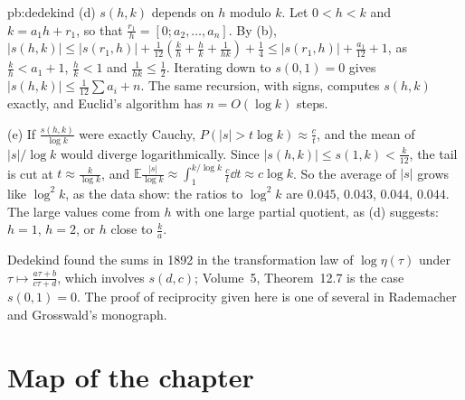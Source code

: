 \begin{solution}{pb:dedekind}
(d) $s(h,k)$ depends on $h$ modulo $k$. Let $0<h<k$ and $k=a_1h+r_1$, so that $\frac{r_1}h=[0;a_2,\dots,a_n]$. By (b),
$|s(h,k)|\le|s(r_1,h)|+\frac1{12}(\frac kh+\frac hk+\frac1{hk})+\frac14\le|s(r_1,h)|+\frac{a_1}{12}+1$, as $\frac kh<a_1+1$, $\frac hk<1$ and $\frac1{hk}\le\frac12$. Iterating down to $s(0,1)=0$ gives
$|s(h,k)|\le\frac1{12}\sum a_i+n$. The same recursion, with signs, computes $s(h,k)$ exactly, and Euclid's algorithm has $n=O(\log k)$ steps.

(e) If $\frac{s(h,k)}{\log k}$ were exactly Cauchy, $P(|s|>t\log k)\approx\frac c t$, and the mean of $|s|/\log k$ would diverge logarithmically. Since $|s(h,k)|\le s(1,k)<\frac k{12}$, the tail is cut
at $t\approx\frac k{\log k}$, and $\mathbb E\frac{|s|}{\log k}\approx\int_1^{k/\log k}\frac c t\dd t\approx c\log k$. So the average of $|s|$ grows like $\log^2k$, as the data show: the ratios to
$\log^2k$ are $0.045$, $0.043$, $0.044$, $0.044$. The large values come from $h$ with one large partial quotient, as (d) suggests: $h=1$, $h=2$, or $h$ close to $\frac ka$.


\leads Dedekind found the sums in 1892 in the transformation law of $\log\eta(\tau)$ under $\tau\mapsto\frac{a\tau+b}{c\tau+d}$, which involves $s(d,c)$; Volume~5, Theorem~12.7 is the case
$s(0,1)=0$. The proof of reciprocity given here is one of several in Rademacher and Grosswald's monograph.
\end{solution}

\section*{Map of the chapter}

